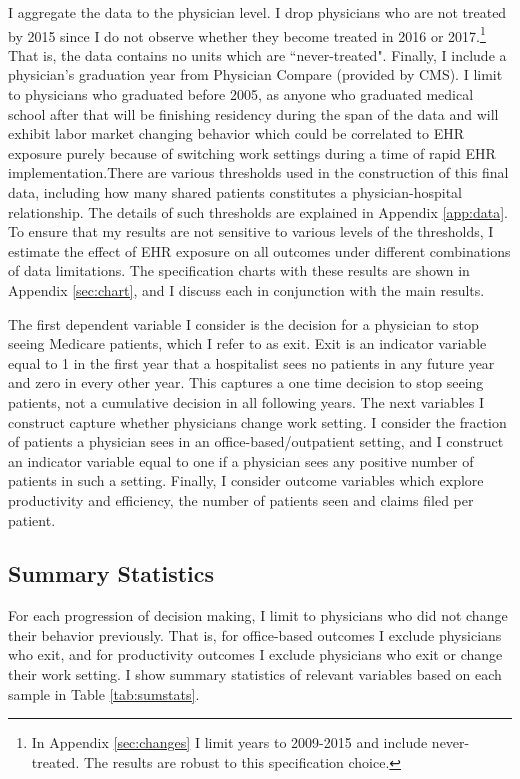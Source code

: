 \documentclass[12pt]{article}
\begin{document}
I aggregate the data to the physician level. I drop physicians who are not treated by 2015 since I do not observe whether they become treated in 2016 or 2017.\footnote{In Appendix \ref{sec:changes} I limit years to 2009-2015 and include never-treated. The results are robust to this specification choice.} That is, the data contains no units which are ``never-treated". Finally, I include a physician's graduation year from Physician Compare (provided by CMS). I limit to physicians who graduated before 2005, as anyone who graduated medical school after that will be finishing residency during the span of the data and will exhibit labor market changing behavior which could be correlated to EHR exposure purely because of switching work settings during a time of rapid EHR implementation.There are various thresholds used in the construction of this final data, including how many shared patients constitutes a physician-hospital relationship. The details of such thresholds are explained in Appendix \ref{app:data}. To ensure that my results  are not sensitive to various levels of the thresholds, I estimate the effect of EHR exposure on all outcomes under different combinations of data limitations. The specification charts with these results are shown in Appendix \ref{sec:chart}, and I discuss each in conjunction with the main results. 

The first dependent variable I consider is the decision for a physician to stop seeing Medicare patients, which I refer to as exit. Exit is an indicator variable equal to 1 in the first year that a hospitalist sees no patients in any future year and zero in every other year. This captures a one time decision to stop seeing patients, not a cumulative decision in all following years. The next variables I construct capture whether physicians change work setting. I consider the fraction of patients a physician sees in an office-based/outpatient setting, and I construct an indicator variable equal to one if a physician sees any positive number of patients in such a setting. Finally, I consider outcome variables which explore productivity and efficiency, the number of patients seen and claims filed per patient.


\subsection{Summary Statistics}

For each progression of decision making, I limit to physicians who did not change their behavior previously. That is, for office-based outcomes I exclude physicians who exit, and for productivity outcomes I exclude physicians who exit or change their work setting. I show summary statistics of relevant variables based on each sample in Table \ref{tab:sumstats}. 
\end{document}
